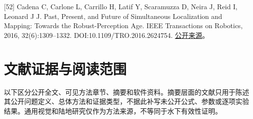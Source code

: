 {[}52{]} Cadena C, Carlone L, Carrillo H, Latif Y, Scaramuzza D, Neira J, Reid I, Leonard J J. Past, Present, and Future of Simultaneous Localization and Mapping: Towards the Robust-Perception Age. IEEE Transactions on Robotics, 2016, 32(6):1309--1332. DOI:10.1109/TRO.2016.2624754. \href{https://arxiv.org/abs/1606.05830}{公开来源}。

\hypertarget{ux6587ux732eux8bc1ux636eux4e0eux9605ux8bfbux8303ux56f4}{%
\section{文献证据与阅读范围}\label{ux6587ux732eux8bc1ux636eux4e0eux9605ux8bfbux8303ux56f4}}

以下区分公开全文、可见方法章节、摘要和软件资料。摘要层面的文献只用于陈述其公开问题定义、总体方法和证据类型，不据此补写未公开公式、参数或逐项实验结果。通用视觉和陆地研究仅作为方法来源，不等同于水下有效性证明。

